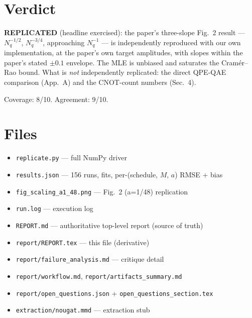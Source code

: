 \documentclass[11pt]{article}
\begin{document}
\section{Verdict}

\textbf{REPLICATED} (headline exercised): the paper's three-slope Fig.\ 2
result --- $N_q^{-1/2}$, $N_q^{-3/4}$, approaching $N_q^{-1}$ --- is
independently reproduced with our own implementation, at the paper's own
target amplitudes, with slopes within the paper's stated $\pm 0.1$ envelope.
The MLE is unbiased and saturates the Cram\'er--Rao bound. What is \emph{not}
independently replicated: the direct QPE-QAE comparison (App.\ A) and the
CNOT-count numbers (Sec.\ 4).

Coverage: 8/10. Agreement: 9/10.

\section{Files}

\begin{itemize}
    \item \verb|replicate.py| --- full NumPy driver
    \item \verb|results.json| --- 156 runs, fits, per-(schedule, $M$, $a$) RMSE + bias
    \item \verb|fig_scaling_a1_48.png| --- Fig.\ 2 (a=1/48) replication
    \item \verb|run.log| --- execution log
    \item \verb|REPORT.md| --- authoritative top-level report (source of truth)
    \item \verb|report/REPORT.tex| --- this file (derivative)
    \item \verb|report/failure_analysis.md| --- critique detail
    \item \verb|report/workflow.md|, \verb|report/artifacts_summary.md|
    \item \verb|report/open_questions.json| + \verb|open_questions_section.tex|
    \item \verb|extraction/nougat.mmd| --- extraction stub
\end{itemize}


\end{document}
